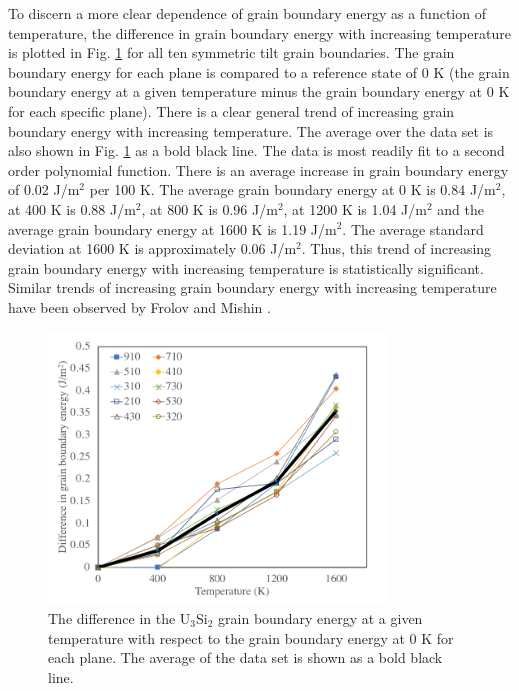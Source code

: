 \documentclass[review]{elsarticle}
\begin{document}
\FloatBarrier

To discern a more clear dependence of grain boundary energy as a function of temperature, the difference in grain boundary energy with increasing temperature is plotted in Fig. \ref{fig:gbdeltaT} for all ten symmetric tilt grain boundaries. The grain boundary energy for each plane is compared to a reference state of 0 K (the grain boundary energy at a given temperature minus the grain boundary energy at 0 K for each specific plane). There is a clear general trend of increasing grain boundary energy with increasing temperature. The average over the data set is also shown in Fig. \ref{fig:gbdeltaT} as a bold black line. The data is most readily fit to a second order polynomial function. There is an average increase in grain boundary energy of 0.02 J/m$^{2}$ per 100 K. The average grain boundary energy at 0 K is 0.84 J/m$^{2}$, at 400 K is 0.88 J/m$^{2}$, at 800 K is 0.96 J/m$^{2}$, at 1200 K is 1.04 J/m$^{2}$ and the average grain boundary energy at 1600 K is 1.19 J/m$^{2}$. The average standard deviation at 1600 K is approximately 0.06 J/m$^{2}$. Thus, this trend of increasing grain boundary energy with increasing temperature is statistically significant. Similar trends of increasing grain boundary energy with increasing temperature have been observed by Frolov and Mishin \cite{frolov2012}. 
 
 \begin{figure}[h]
 \centering
 \includegraphics[width=0.8\textwidth]{deltaGB_vs_T.png} 
 \caption{The difference in the U$_{3}$Si$_{2}$ grain boundary energy at a given temperature with respect to the grain boundary energy at 0 K for each plane. The average of the data set is shown as a bold black line. }
 \label{fig:gbdeltaT}
\end{figure}
\end{document}
